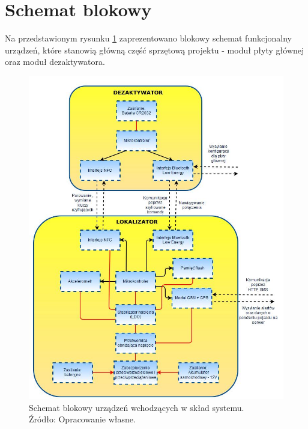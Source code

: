 \section{Schemat blokowy}
\label{Schemat_blokowy_urządzen}
Na przedstawionym rysunku \ref{fig:image_device_block_diagram} zaprezentowano blokowy schemat funkcjonalny urządzeń, które stanowią główną część sprzętową projektu - moduł płyty głównej oraz moduł dezaktywatora. 

\begin{figure}[h]
	\centering
	\includegraphics[width=13cm]{img/introduction/device_block_diagram.jpg}
	\caption{Schemat blokowy urządzeń wchodzących w skład systemu. \\ Źródło: Opracowanie własne.}
	\label{fig:image_device_block_diagram}
\end{figure}
	
	
